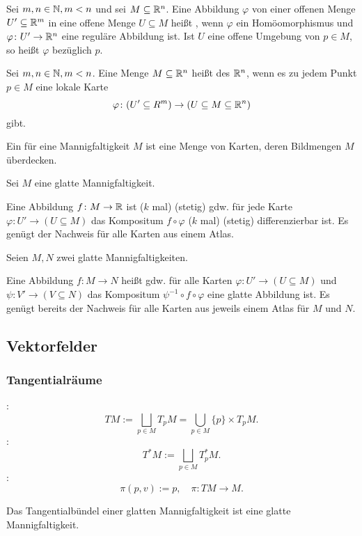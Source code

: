 \begin{Definition}
Sei $m,n\in\mathbb N, m<n$ und sei $M\subseteq\mathbb R^n$.
Eine Abbildung $\varphi$ von einer offenen Menge $U'\subseteq\mathbb R^m$
in eine offene Menge $U\subseteq M$ heißt ,
wenn $\varphi$ ein Homöomorphismus und $\varphi\colon U'\to\mathbb R^n$
eine reguläre Abbildung ist. Ist $U$ eine offene Umgebung von
$p\in M$, so heißt $\varphi$  bezüglich $p$.
\end{Definition}
\pagebreak[1]
\begin{Definition}
Sei $m,n\in\mathbb N, m<n$. Eine Menge $M\subseteq\mathbb R^n$ heißt
 des $\mathbb R^n$, wenn
es zu jedem Punkt $p\in M$ eine lokale Karte
\begin{equation}
\varphi\colon (U'\subseteq R^m)\to (U\subseteq M\subseteq\mathbb R^n)
\end{equation}
gibt.
\end{Definition}
\begin{Definition} Ein  für eine Mannigfaltigkeit $M$
ist eine Menge von Karten, deren Bildmengen $M$ überdecken.
\end{Definition}
Sei $M$ eine glatte Mannigfaltigkeit.
\begin{Definition}
Eine Abbildung $f\colon M\to\mathbb R$ ist ($k$ mal) (stetig)
gdw. für jede Karte $\varphi\colon U'\to (U\subseteq M)$ das
Kompositum $f\circ\varphi$ ($k$ mal) (stetig) differenzierbar ist.
Es genügt der Nachweis für alle Karten aus einem Atlas.
\end{Definition}
Seien $M,N$ zwei glatte Mannigfaltigkeiten.
\begin{Definition} Eine Abbildung $f\colon M\to N$ heißt 
gdw. für alle Karten $\varphi\colon U'\to (U\subseteq M)$ und
$\psi\colon V'\to (V\subseteq N)$ das Kompositum
$\psi^{-1}\circ f\circ\varphi$ eine glatte Abbildung ist.
Es genügt bereits der Nachweis für alle Karten aus jeweils einem
Atlas für $M$ und $N$.
\end{Definition}


\subsection{Vektorfelder}
\subsubsection{Tangentialräume}
\begin{Definition} :
\begin{equation}
TM := \bigsqcup_{p\in M} T_p M = \bigcup_{p\in M} \{p\}\times T_p M.
\end{equation}
:
\begin{equation}
T^*M := \bigsqcup_{p\in M} T_p^* M.
\end{equation}
:
\begin{equation}
\pi(p,v):=p,\quad\pi\colon TM\to M.
\end{equation}
\end{Definition}
\noindent
Das Tangentialbündel einer glatten Mannigfaltigkeit ist eine
glatte Mannigfaltigkeit.

